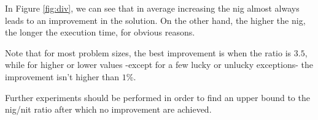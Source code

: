 \documentclass{article}
\begin{document}
In Figure \ref{fig:div}, we can see that in average increasing the nig almost always leads to an improvement in the solution.
On the other hand, the higher the nig, the longer the execution time, for obvious reasons.

Note that for most problem sizes, the best improvement is when the ratio is $3.5$, while for higher or lower values -except for a few lucky or unlucky exceptions- the improvement isn't higher than $1\%$.

Further experiments should be performed in order to find an upper bound to the nig/nit ratio after which no improvement are achieved.

\printbibliography
\end{document}

